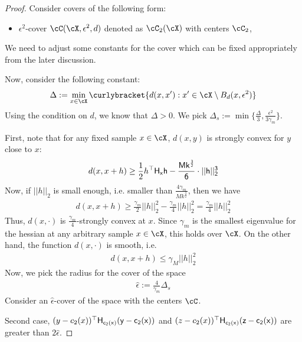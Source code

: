\begin{proof}
    Consider covers of the following form:
    \begin{itemize}
        \item $\epsilon^2$-cover $\cC(\cX, \epsilon^2, d)$ denoted as $\cC_2(\cX)$ with centers $\cC_2$,
    \end{itemize}
    We need to adjust some constants for the cover which can be fixed appropriately from the later discussion. 

    Now, consider the following constant:
    \begin{align*}
        \Delta := \min_{x \in \cX} \curlybracket{d(x,x') : x' \in \cX \setminus B_d(x,\epsilon^2)}
    \end{align*}
    Using the condition on $d$, we know that $\Delta > 0$. We pick $\Delta_s := \min\{\frac{\Delta}{3}, \frac{\epsilon^2}{3\gamma_m}\}$.

    
    First, note that for any fixed sample $x \in \cX$, $d(x, y)$ is strongly convex for $y$ close to $x$:
    \begin{align*}
        d(x, x+ h) \ge \frac{1}{2}h^{\top}\sf{H}_x h - \frac{M k^{\frac{3}{2}}}{6} \cdot||h||^{3}_2
    \end{align*}
    Now, if $||h||_2$ is small enough, i.e. smaller than $\frac{4\gamma_m}{M k^{\frac{3}{2}}}$, then we have 
    \begin{align}
        d(x, x+ h) \ge \frac{\gamma_m}{2}||h||^2_2 - \frac{\gamma_m}{4}||h||^2_2 = \frac{\gamma_m}{4}||h||^2_2 \label{eq: strongconvex}
    \end{align}
    Thus, $d(x,\cdot)$ is $\frac{\gamma_m}{4}$-strongly convex at $x$. Since $\gamma_m$ is the smallest eigenvalue for the hessian at any arbitrary sample $x \in \cX$, this holds over $\cX$. On the other hand, the function $d(x,\cdot)$ is smooth, i.e.
    \begin{align}
        d(x, x+ h) \le \gamma_M ||h||^2_2 \label{eq: smoothconvex}
    \end{align}
    Now, we pick the radius for the cover of the space 
    \begin{align*}
        \hat{\epsilon} := \frac{4}{\gamma_m} \Delta_s
    \end{align*}
    Consider an $\hat{\epsilon}$-cover of the space with the centers $\cC$.

    Second case, $(y - c_2(x))^{\top}\sf{H}_{c_2(x)}(y - c_2(x))$ and $(z - c_2(x))^{\top}\sf{H}_{c_2(x)}(z - c_2(x))$ are greater than $2 \hat{\epsilon}$.
    

\end{proof}
